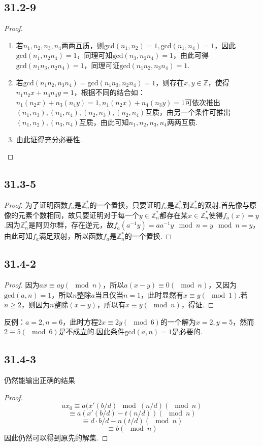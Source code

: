 \documentclass[twocolumn]{article}
\newenvironment{SChinese}{
	\CJKfamily{gbsn}
	\CJKtilde
	\CJKnospace}{}
\begin{document}
\begin{CJK}{UTF8}{}
\begin{SChinese}
			\subsection*{31.2-9}
				\begin{proof}
				\begin{enumerate}[(1)]
					\item 若$n_1,n_2,n_3,n_4$两两互质，则$\textrm{gcd}(n_1,n_2)=1,\textrm{gcd}(n_1,n_4)=1$，因此$\textrm{gcd}(n_1,n_2n_4)=1$，同理可知$\textrm{gcd}(n_3,n_2n_4)=1$，由此可得$\textrm{gcd}(n_1n_3,n_2n_4)=1$，同理可证$\textrm{gcd}(n_1n_2,n_3n_4)=1$. \\
					\item 若$\textrm{gcd}(n_1n_2,n_3n_4)=\textrm{gcd}(n_1n_3,n_2n_4)=1$，则存在$x,y\in\mathbb{Z}$，使得$n_1n_2x+n_3n_4y=1$，根据不同的结合如：$n_1(n_2x)+n_3(n_4y)=1,n_1(n_2x)+n_4(n_3y)=1$可依次推出$(n_1,n_3),(n_1,n_4),(n_2,n_3),(n_2,n_4)$互质，由另一个条件可推出$(n_1,n_2),(n_3,n_4)$互质，由此可知$n_1,n_2,n_3,n_4$两两互质.
					\item 由此证得充分必要性.
				\end{enumerate}
				\end{proof}
			\subsection*{31.3-5}
				\begin{proof}
					为了证明函数$f_a$是$\mathbb{Z}_n^*$的一个置换，只要证明$f_a$是$\mathbb{Z}_n^*$到$\mathbb{Z}_n^*$的双射.首先像与原像的元素个数相同，故只要证明对于每一个$y\in\mathbb{Z}_n^*$都存在某$x\in\mathbb{Z}_n^*$使得$f_a(x)=y$.因为$\mathbb{Z}_n^*$是阿贝尔群，存在逆元，故$f_a(a^{-1}y)=aa^{-1}y\mod n=y\mod n=y$，由此可知$f_a$满足双射，所以函数$f_a$是$\mathbb{Z}_n^*$的一个置换.
				\end{proof}
			\subsection*{31.4-2}
				\begin{proof}
					因为$ax\equiv ay(\mod n)$，所以$a(x-y)\equiv0(\mod n)$，又因为$\textrm{gcd}(a,n)=1$，所以$n$整除$a$当且仅当$n=1$，此时显然有$x\equiv y(\mod1)$.若$n\ge2$，则因为$n$整除$(x-y)$，所以有$x\equiv y(\mod n)$，得证.
				\end{proof}
				反例：$a=2,n=6$，此时方程$2x\equiv2y(\mod6)$的一个解为$x=2,y=5$，然而$2\equiv5(\mod6)$是不成立的.因此条件$\textrm{gcd}(a,n)=1$是必要的.
			\subsection*{31.4-3}
				仍然能输出正确的结果
				\begin{proof}
					\[ax_0\equiv a(x'(b/d)\mod(n/d)(\mod n)\] 
					\[\equiv a(x'(b/d)-t(n/d))(\mod n)\]
					\[\equiv d\cdot b/d-n(t/d)(\mod n)\]
					\[\equiv b(\mod n)\]
					因此仍然可以得到原先的解集.
				\end{proof}

\end{SChinese}
\end{CJK}
\end{document}
